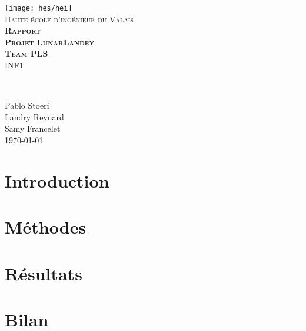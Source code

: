 \documentclass[11pt,titlepage]{report}
\def\Team{Team PLS}
\def\Autora{Pablo Stoeri}
\def\Autorb{Landry Reynard}
\def\Autorc{Samy Francelet}
\begin{document}
\begin{titlepage}
	\centering
    \texttt{[image: hes/hei]}\\[1cm] 	%
    \textsc{\LARGE Haute école d'ingénieur du Valais}\\ \vspace{\fill}
    \textbf{\textsc{\fontsize{50}{50}\selectfont Rapport}}\\[0.8cm]
		\textbf{\textsc{\fontsize{30}{30}\selectfont Projet LunarLandry}}\\[0.8cm]
		\textbf{\textsc{\fontsize{20}{20}\selectfont \Team }}\\ \vspace{\fill}
	\textsc{\LARGE INF1}\\[0.4cm]
	\rule{\linewidth}{0.2 mm} \\[0.5 cm]
		\Autora \\
		\Autorb \\
		\Autorc \\[2cm]
	\today
\end{titlepage}
\restoregeometry

\tableofcontents

\chapter{Introduction}


\chapter{Méthodes}


\chapter{Résultats}


\chapter{Bilan}






\end{document}
